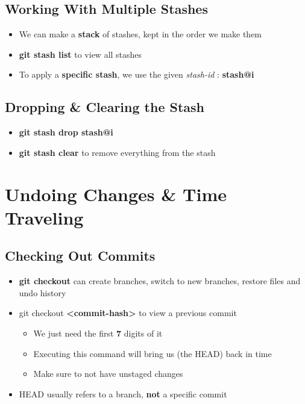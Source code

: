 \documentclass{report}
\newcommand{\warning}{
	{\fontencoding{U}\fontfamily{futs}\selectfont\char 66\relax}
}
\begin{document}
\section{Working With Multiple Stashes}

\begin{itemize}
	\item We can make a \textbf{stack} of stashes, kept in the order we make them 
	\item \textbf{git stash list} to view all stashes 
	\item To apply a \textbf{specific stash}, we use the given \textit{stash-id} : \textbf{stash@{i}}  
\end{itemize}


\section{Dropping \& Clearing the Stash}

\begin{itemize}
	\item \textbf{git stash drop stash@{i}} 
	\item \textbf{git stash clear} to remove everything from the stash
\end{itemize}



\chapter{Undoing Changes \& Time Traveling}


\section{Checking Out Commits}

\begin{itemize}
	\item \textbf{git checkout} can create branches, switch to new branches, restore files and undo history 
	\item git checkout \textbf{<commit-hash>} to view a previous commit
		\begin{itemize}
			\item \warning We just need the first \textbf{7} digits of it 
			\item Executing this command will bring us (the HEAD) back in time 
			\item Make sure to not have unstaged changes
		\end{itemize}
	\item HEAD usually refers to a branch, \textbf{not} a specific commit
\end{itemize}
\end{document}
